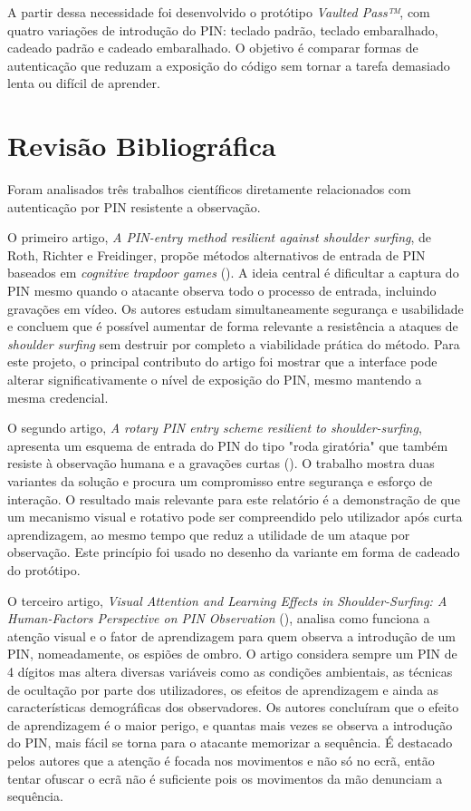 \documentclass[a4paper]{article}
\begin{document}
A partir dessa necessidade foi desenvolvido o protótipo \textit{Vaulted Pass™}, com quatro variações de introdução do PIN: teclado padrão, 
teclado embaralhado, cadeado padrão e cadeado embaralhado. O objetivo é comparar formas de autenticação que reduzam a exposição do código 
sem tornar a tarefa demasiado lenta ou difícil de aprender.

\section{Revisão Bibliográfica}
Foram analisados três trabalhos científicos diretamente relacionados com autenticação por PIN resistente a observação.

O primeiro artigo, \textit{A PIN-entry method resilient against shoulder surfing}, de Roth, Richter e Freidinger, propõe métodos alternativos 
de entrada de PIN baseados em \textit{cognitive trapdoor games} (\cite{roth2004pin}). A ideia central é dificultar a captura do PIN mesmo 
quando o atacante observa todo o processo de entrada, incluindo gravações em vídeo. Os autores estudam simultaneamente segurança e usabilidade 
e concluem que é possível aumentar de forma relevante a resistência a ataques de \textit{shoulder surfing} sem destruir por completo a 
viabilidade prática do método. Para este projeto, o principal contributo do artigo foi mostrar que a interface pode alterar significativamente 
o nível de exposição do PIN, mesmo mantendo a mesma credencial.

O segundo artigo, \textit{A rotary PIN entry scheme resilient to shoulder-surfing}, apresenta um esquema de entrada do PIN do tipo "roda giratória" 
que também resiste à observação humana e a gravações curtas (\cite{rotary2009}). O trabalho mostra duas variantes da solução e 
procura um compromisso entre segurança e esforço de interação. O resultado mais relevante para este relatório é a demonstração de 
que um mecanismo visual e rotativo pode ser compreendido pelo utilizador após curta aprendizagem, ao mesmo tempo que reduz a utilidade 
de um ataque por observação. Este princípio foi usado no desenho da variante em forma de cadeado do protótipo.

O terceiro artigo, \textit{Visual Attention and Learning Effects in Shoulder-Surfing: A Human-Factors Perspective on PIN Observation} (\cite{visualattention2026}), analisa 
como funciona a atenção visual e o fator de aprendizagem para quem observa a introdução de um PIN, nomeadamente, os espiões de ombro. O artigo 
considera sempre um PIN de 4 dígitos mas altera diversas variáveis como as condições ambientais, as técnicas de ocultação por parte dos utilizadores, 
os efeitos de aprendizagem e ainda as características demográficas dos observadores. Os autores concluíram que o efeito de aprendizagem é o maior perigo, 
e quantas mais vezes se observa a introdução do PIN, mais fácil se torna para o atacante memorizar a sequência. É destacado pelos autores que a atenção é focada 
nos movimentos e não só no ecrã, então tentar ofuscar o ecrã não é suficiente pois os movimentos da mão denunciam a sequência.
\end{document}

